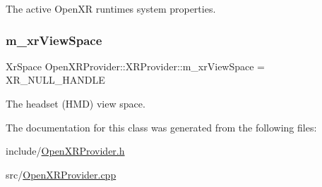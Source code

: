 The active Open\+XR runtime\textquotesingle{}s system properties. 

\mbox{\label{class_open_x_r_provider_1_1_x_r_provider_a5c3ba17df358b63e82c13ae09700f943}} 
\subsubsection{\texorpdfstring{m\_xrViewSpace}{m\_xrViewSpace}}
{\footnotesize\ttfamily Xr\+Space Open\+X\+R\+Provider\+::\+X\+R\+Provider\+::m\+\_\+xr\+View\+Space = X\+R\+\_\+\+N\+U\+L\+L\+\_\+\+H\+A\+N\+D\+LE\hspace{0.3cm}{\ttfamily [private]}}



The headset (H\+MD) view space. 



The documentation for this class was generated from the following files\+:\begin{DoxyCompactItemize}
\item 
include/\mbox{\hyperlink{_open_x_r_provider_8h}{Open\+X\+R\+Provider.\+h}}\item 
src/\mbox{\hyperlink{_open_x_r_provider_8cpp}{Open\+X\+R\+Provider.\+cpp}}\end{DoxyCompactItemize}
